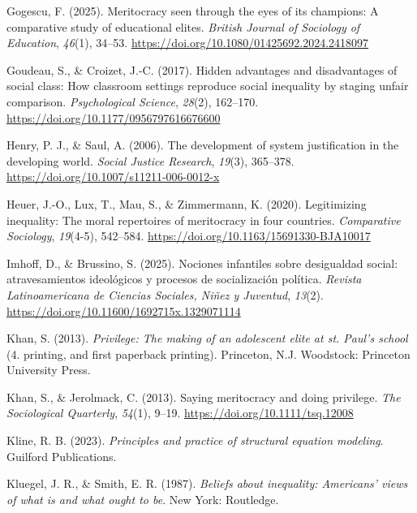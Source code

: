 \documentclass[
  11pt,
]{article}
\newlength{\cslhangindent}
\newenvironment{CSLReferences}[2] %
 {\begin{list}{}{%
  \setlength{\itemindent}{0pt}
  \setlength{\leftmargin}{0pt}
  \setlength{\parsep}{0pt}
  \ifodd #1
   \setlength{\leftmargin}{\cslhangindent}
   \setlength{\itemindent}{-1\cslhangindent}
  \fi
  \setlength{\itemsep}{#2\baselineskip}}}
 {\end{list}}
\begin{document}
\begin{CSLReferences}{1}{0}
Gogescu, F. (2025). Meritocracy seen through the eyes of its champions:
A comparative study of educational elites. \emph{British Journal of
Sociology of Education}, \emph{46}(1), 34--53.
\url{https://doi.org/10.1080/01425692.2024.2418097}

Goudeau, S., \& Croizet, J.-C. (2017). Hidden advantages and
disadvantages of social class: How classroom settings reproduce social
inequality by staging unfair comparison. \emph{Psychological Science},
\emph{28}(2), 162--170. \url{https://doi.org/10.1177/0956797616676600}

Henry, P. J., \& Saul, A. (2006). The development of system
justification in the developing world. \emph{Social Justice Research},
\emph{19}(3), 365--378. \url{https://doi.org/10.1007/s11211-006-0012-x}

Heuer, J.-O., Lux, T., Mau, S., \& Zimmermann, K. (2020). Legitimizing
inequality: The moral repertoires of meritocracy in four countries.
\emph{Comparative Sociology}, \emph{19}(4-5), 542--584.
\url{https://doi.org/10.1163/15691330-BJA10017}

Imhoff, D., \& Brussino, S. (2025). Nociones infantiles sobre
desigualdad social: atravesamientos ideológicos y procesos de
socialización política. \emph{Revista Latinoamericana de Ciencias
Sociales, Niñez y Juventud}, \emph{13}(2).
\url{https://doi.org/10.11600/1692715x.1329071114}

Khan, S. (2013). \emph{Privilege: The making of an adolescent elite at
st. Paul's school} (4. printing, and first paperback printing).
Princeton, N.J. Woodstock: Princeton University Press.

Khan, S., \& Jerolmack, C. (2013). Saying meritocracy and doing
privilege. \emph{The Sociological Quarterly}, \emph{54}(1), 9--19.
\url{https://doi.org/10.1111/tsq.12008}

Kline, R. B. (2023). \emph{Principles and practice of structural
equation modeling}. Guilford Publications.

Kluegel, J. R., \& Smith, E. R. (1987). \emph{Beliefs about inequality:
Americans' views of what is and what ought to be}. New York: Routledge.


\end{CSLReferences}
\end{document}
